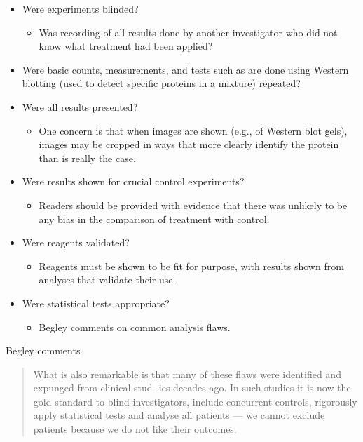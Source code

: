 \documentclass[
  10pt,
  b5paper]{book}
\providecommand{\tightlist}{%
  \setlength{\itemsep}{0pt}\setlength{\parskip}{0pt}}
\begin{document}
\begin{itemize}
\tightlist
\item
  Were experiments blinded?

  \begin{itemize}
  \tightlist
  \item
    Was recording of all results done by another investigator
    who did not know what treatment had been applied?
  \end{itemize}
\item
  Were basic counts, measurements, and tests such as are done
  using Western blotting (used to detect specific proteins in a
  mixture) repeated?
\item
  Were all results presented?

  \begin{itemize}
  \tightlist
  \item
    One concern is that when images are shown (e.g., of Western
    blot gels), images may be cropped in ways that more clearly
    identify the protein than is really the case.
  \end{itemize}
\item
  Were results shown for crucial control experiments?

  \begin{itemize}
  \tightlist
  \item
    Readers should be provided with evidence that there was
    unlikely to be any bias in the comparison of treatment
    with control.
  \end{itemize}
\item
  Were reagents validated?

  \begin{itemize}
  \tightlist
  \item
    Reagents must be shown to be fit for purpose, with results
    shown from analyses that validate their use.
  \end{itemize}
\item
  Were statistical tests appropriate?

  \begin{itemize}
  \tightlist
  \item
    Begley comments on common analysis flaws.
  \end{itemize}
\end{itemize}

Begley comments

\begin{quote}
What is also remarkable is that many of these flaws were
identified and expunged from clinical stud- ies decades ago.
In such studies it is now the gold standard to blind investigators,
include concurrent controls, rigorously apply statistical tests
and analyse all patients --- we cannot exclude patients because
we do not like their outcomes.
\end{quote}
\end{document}
